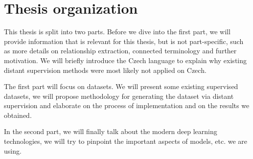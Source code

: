 \section{Thesis organization}
This thesis is split into two parts. Before we dive into the first part, we will provide information that is relevant for this thesis, but is not part-specific, such as more details on relationship extraction, connected terminology and further motivation. We will briefly introduce the Czech language to explain why existing distant supervision methods were most likely not applied on Czech. 

The first part will focus on datasets. We will present some existing supervised datasets, we will propose methodology for generating the dataset via distant supervision and elaborate on the process of implementation and on the results we obtained.   

In the second part, we will finally talk about the modern deep learning technologies, we will try to pinpoint the important aspects of models, etc. we are using. 

 
